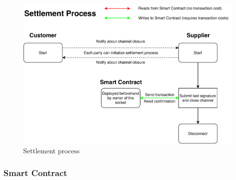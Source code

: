 \begin{figure}[h]
    \includegraphics[width=\textwidth]{img/Plug-Socket-settlement_process.pdf}
    \caption{Settlement process}
    \label{fig:settlement_process}
\end{figure}

\subsubsection{Smart Contract}
